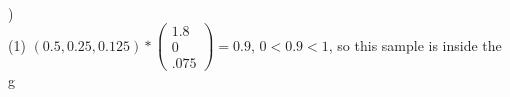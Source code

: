 \documentclass[12pt]{article}
\begin{document}
\noindent \hrulefill \\



)\\
\indent (1) $(0.5, 0.25, 0.125)*
\begin{pmatrix}
1.8\\ 0\\ .075
\end{pmatrix}
= 0.9$, $0 < 0.9 < 1$, so this sample is inside the g



\end{document}
